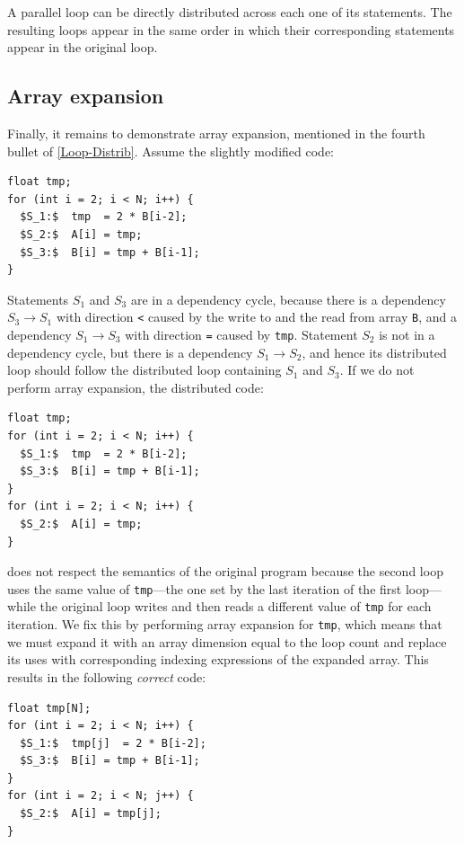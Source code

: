 \begin{corollary}\label{Par-Loop-Distr}
  A parallel loop can be directly distributed across each one of its
  statements. The resulting loops appear in the same order in which
  their corresponding statements appear in the original loop.
\end{corollary}

\subsection{Array expansion}
\label{sec:array-expansion}

Finally, it remains to demonstrate array expansion, mentioned
in the fourth bullet of \cref{Loop-Distrib}. Assume the slightly
modified code:
\begin{lstlisting}[mathescape=true]
float tmp;
for (int i = 2; i < N; i++) {
  $S_1:$  tmp  = 2 * B[i-2];
  $S_2:$  A[i] = tmp;
  $S_3:$  B[i] = tmp + B[i-1];
}
\end{lstlisting}
Statements $S_1$ and $S_3$ are in a dependency cycle, because
there is a dependency $S_3\to S_1$ with direction \texttt{<} caused
by the write to and the read from array \texttt{B}, and a dependency
$S_1\to S_3$ with direction \texttt{=} caused by \texttt{tmp}.
Statement $S_2$ is not in a dependency cycle, but there is a
dependency $S_1\to S_2$, and hence its distributed loop
should follow the distributed loop containing $S_1$ and $S_3$.
If we do not perform array expansion, the distributed code:

\pagebreak
\begin{lstlisting}[mathescape=true]
float tmp;
for (int i = 2; i < N; i++) {
  $S_1:$  tmp  = 2 * B[i-2];
  $S_3:$  B[i] = tmp + B[i-1];
}
for (int i = 2; i < N; i++) {
  $S_2:$  A[i] = tmp;
}
\end{lstlisting}
\noindent does not respect the semantics of the original program
because the second loop uses the same value of \texttt{tmp}---the one
set by the last iteration of the first loop---while the original loop
writes and then reads a different value of \texttt{tmp} for each
iteration. We fix this by performing array expansion for \texttt{tmp},
which means that we must expand it with an array dimension equal to
the loop count and replace its uses with corresponding indexing
expressions of the expanded array.  This results in the following
\emph{correct} code:

\begin{lstlisting}[mathescape=true]
float tmp[N];
for (int i = 2; i < N; i++) {
  $S_1:$  tmp[j]  = 2 * B[i-2];
  $S_3:$  B[i] = tmp + B[i-1];
}
for (int i = 2; i < N; j++) {
  $S_2:$  A[i] = tmp[j];
}
\end{lstlisting}

